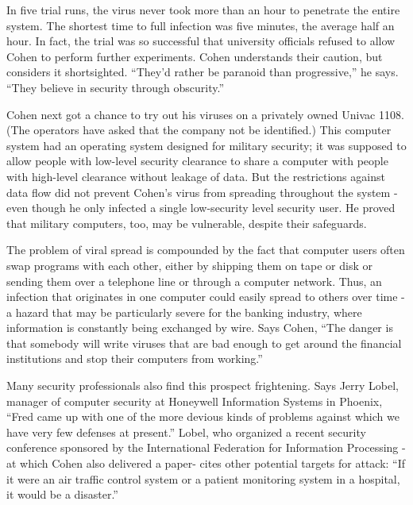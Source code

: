   In  five  trial  runs,  the virus never took more than  an  hour  to 
penetrate  the entire system.  The shortest time to full infection was 
five  minutes,  the average half an hour.  In fact,  the trial was  so 
successful that university officials refused to allow Cohen to perform 
further experiments. Cohen understands their caution, but considers it 
shortsighted.  ``They'd rather be paranoid than progressive,'' he  says. 
``They believe in security through obscurity.'' 

  Cohen  next got a chance to try out his viruses on a privately owned 
Univac  1108.   (The  operators  have asked that the  company  not  be 
identified.)   This computer system had an operating  system  designed 
for military security;  it was supposed to allow people with low-level 
security  clearance  to share a computer with people  with  high-level 
clearance without leakage of data.   But the restrictions against data 
flow  did  not  prevent Cohen's virus from  spreading  throughout  the 
system  - even  though  he only infected a single  low-security  level 
security  user.   He  proved that  military  computers,  too,  may  be 
vulnerable, despite their safeguards.  

  The  problem of viral spread is compounded by the fact that computer 
users often swap programs with each other,  either by shipping them on 
tape  or  disk  or sending them over a telephone  line  or  through  a 
computer network.  Thus,  an infection that originates in one computer 
could  easily  spread  to  others over time - a  hazard  that  may  be 
particularly  severe  for the banking industry,  where information  is 
constantly being exchanged by wire.   Says Cohen,  ``The danger is that 
somebody  will  write viruses that are bad enough to  get  around  the 
financial institutions and stop their computers from working.'' 

  Many  security  professionals also find this  prospect  frightening. 
Says   Jerry  Lobel,   manager  of  computer  security  at   Honeywell 
Information  Systems  in Phoenix,  ``Fred came up with one of the  more 
devious  kinds of problems against which we have very few defenses  at 
present.'' Lobel,  who organized a recent security conference sponsored 
by  the International Federation for Information Processing -at  which 
Cohen  also  delivered  a paper- cites  other  potential  targets  for 
attack:  ``If  it  were  an  air traffic control system  or  a  patient 
monitoring system in a hospital, it would be a disaster.'' 

